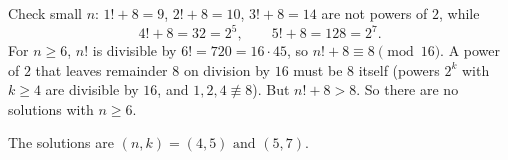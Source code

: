 Check small $n$: $1!+8=9$, $2!+8=10$, $3!+8=14$ are not powers of $2$, while
\[4!+8=32=2^5,\qquad 5!+8=128=2^7.\]
For $n\ge6$, $n!$ is divisible by $6!=720=16\cdot45$, so $n!+8\equiv8\pmod{16}$. A power of $2$ that leaves remainder $8$ on division by $16$ must be $8$ itself (powers $2^k$ with $k\ge4$ are divisible by $16$, and $1,2,4\not\equiv8$). But $n!+8>8$. So there are no solutions with $n\ge6$.

The solutions are $\boxed{(n,k)=(4,5)\text{ and }(5,7)}$.
